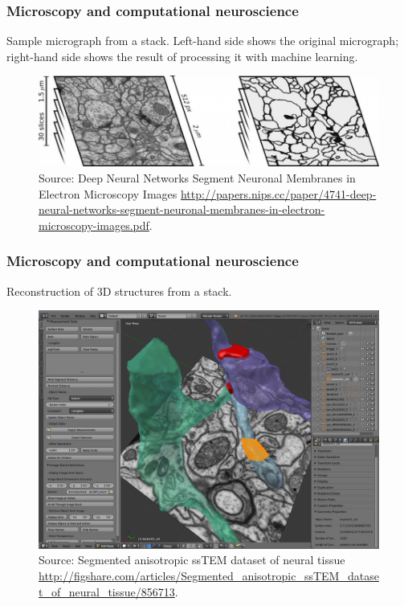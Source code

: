 \documentclass{beamer}
\begin{document}
\begin{frame}
\frametitle{Microscopy and computational neuroscience}

Sample micrograph from a stack. Left-hand side shows the original
micrograph; right-hand side shows the result of processing it with
machine learning.

\begin{figure}[H]
    \centering
    \includegraphics[scale=0.3]{../blog/images/biomed-neurons}
    \caption{Source: Deep Neural Networks Segment Neuronal Membranes in Electron Microscopy Images
      \url{http://papers.nips.cc/paper/4741-deep-neural-networks-segment-neuronal-membranes-in-electron-microscopy-images.pdf}.}
    \label{fig:stack}
\end{figure}

\end{frame}

\begin{frame}
\frametitle{Microscopy and computational neuroscience}

Reconstruction of 3D structures from a stack.

\begin{figure}[H]
    \centering
    \includegraphics[scale=0.2]{../blog/images/NeuroMorph_screenshot.png}
    \caption{Source: Segmented anisotropic ssTEM dataset of neural tissue
      \url{http://figshare.com/articles/Segmented_anisotropic_ssTEM_dataset_of_neural_tissue/856713}.}
    \label{fig:3d_stack}
\end{figure}

\end{frame}
\end{document}
